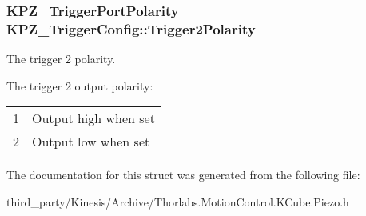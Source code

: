\subsubsection[{\texorpdfstring{Trigger2\+Polarity}{Trigger2Polarity}}]{\setlength{\rightskip}{0pt plus 5cm}K\+P\+Z\+\_\+\+Trigger\+Port\+Polarity K\+P\+Z\+\_\+\+Trigger\+Config\+::\+Trigger2\+Polarity}\hypertarget{struct_k_p_z___trigger_config_a981908163f523061ccee8447d5dc2953}{}\label{struct_k_p_z___trigger_config_a981908163f523061ccee8447d5dc2953}


The trigger 2 polarity. 

The trigger 2 output polarity\+: \tabulinesep=1mm
\begin{longtabu} spread 0pt [c]{*2{|X[-1]}|}
&Output high when set \\
2&Output low when set \\
\end{longtabu}


The documentation for this struct was generated from the following file\+:\begin{DoxyCompactItemize}
\item 
third\+\_\+party/\+Kinesis/\+Archive/Thorlabs.\+Motion\+Control.\+K\+Cube.\+Piezo.\+h\end{DoxyCompactItemize}
